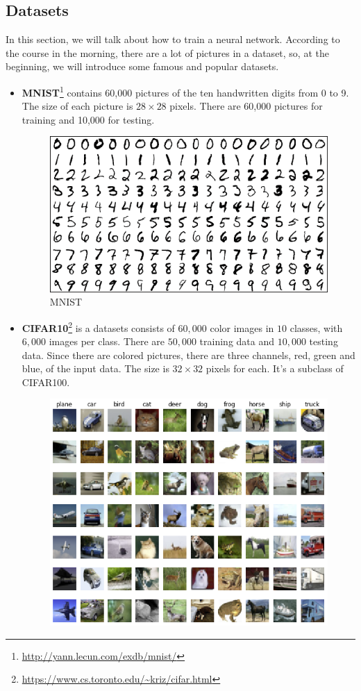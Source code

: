 \subsection{Datasets}
In this section, we will talk about how to train a neural network. According to the course in the morning, there are a lot of pictures in a dataset, so, at the beginning, we will introduce some famous and popular datasets. 
\begin{itemize}
\item {\bf MNIST}\footnote{\url{http://yann.lecun.com/exdb/mnist/}} contains 60,000 pictures of the ten handwritten digits from 0 to 9. The size of each picture is $28\times 28$ pixels. There are 60,000 pictures for training and 10,000 for testing.
\begin{figure}
\centering
\includegraphics[scale=0.5]{./figures/497Proj_mnist}
\caption{MNIST}
\end{figure}
\item {\bf CIFAR10}\footnote{\url{https://www.cs.toronto.edu/~kriz/cifar.html}} is a datasets consists of $60,000$ color images in $10$ classes, with $6,000$ images per class. There are $50,000$ training data and $10,000$ testing data. Since there are colored pictures, there are three channels, red, green and blue, of the input data. The size is $32\times 32$ pixels for each. It's a subclass of CIFAR100.
\begin{figure}
\centering
\includegraphics[scale=0.5]{./figures/497Proj_cifar10}

\end{figure}
\end{itemize}
